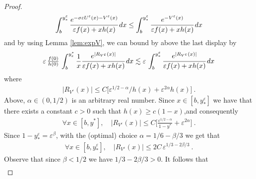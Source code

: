 \documentclass[reqno, 12pt, a4paper]{amsart}
\theoremstyle{plain}
\theoremstyle{definition}
\begin{document}
\begin{proof}
\begin{equation}
\begin{split}
\int_b^{y_*^\varepsilon} \cfrac{e^{-\sigma \varepsilon U^\varepsilon (x) - V^\varepsilon (x) }}{\varepsilon f(x) +x h(x)} \, dx \le \int_{b}^{y^\varepsilon_*} \cfrac{e^{- V^\varepsilon (x) }}{\varepsilon f(x) +x h(x)} \, dx 
\end{split}
\end{equation}
and by using Lemma \ref{lem:expV}, we can bound by above the last display by 
\begin{equation}
\begin{split}
\varepsilon \, \tfrac{f(0)}{h(0)}\,   \int_{b}^{y_\varepsilon^*} \frac{1}{x}  \cfrac{e^{\vert R_{V^\varepsilon} (x)  \vert }}{\varepsilon f(x) +x h(x)} \, dx \lesssim \varepsilon \,   \int_{b}^{y^\varepsilon_*} \cfrac{e^{\vert R_{V^\varepsilon} (x)  \vert }}{\varepsilon f(x) +x h(x)} \, dx
\end{split}
\end{equation}
where 
\begin{equation}
\begin{split}
\vert R_{V^\varepsilon} (x) \vert  \le C \big[ \varepsilon^{1/2 - \alpha}/ h(x) + \varepsilon^{2\alpha} h(x)  \big] \ .
\end{split}
\end{equation}
Above, $\alpha \in (0,1/2)$ is an arbitrary real number. Since $x \in [b,y^\varepsilon_*]$ we have that there exists a constant $c>0$ such that $h(x) \ge c (1-x)$,and consequently 
\begin{equation}
\begin{split}
\forall x \in [b, y^*], \quad \vert R_{{V^\varepsilon}} (x) \vert \le C \big[ \tfrac{\varepsilon^{1/2 - \alpha}}{1-y^*} + \varepsilon^{2\alpha}  \big] \ .
\end{split}
\end{equation}
Since $1-y^\varepsilon_*=\varepsilon^{\beta}$, with the (optimal) choice $\alpha=1/6 - \beta/3$ we get that 
\begin{equation}
\begin{split}
\forall x \in [b, y^\varepsilon_*], \quad \vert R_{V^\varepsilon} (x) \vert \le 2C \, \varepsilon^{1/3 - 2\beta/3} \ .
\end{split}
\end{equation}
Observe that since $\beta<1/2$ we have $1/3- 2\beta/3 >0$. It follows that
\begin{equation}
\begin{split}

\end{split}
\end{equation}
\end{proof}
\end{document}
